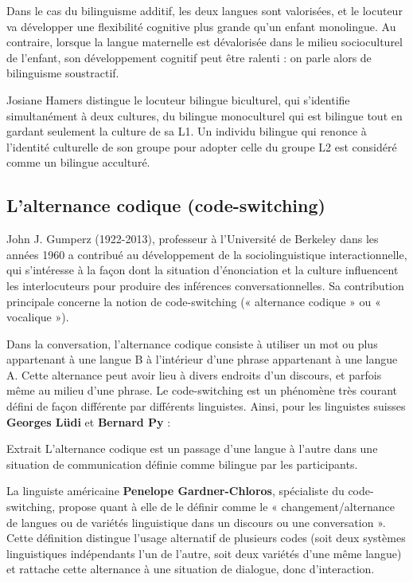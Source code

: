 Dans le cas du bilinguisme additif, les deux langues sont valorisées, et le locuteur va développer une flexibilité cognitive plus grande qu’un enfant monolingue. Au contraire, lorsque la langue maternelle est dévalorisée dans le milieu socioculturel de l’enfant, son développement cognitif peut être ralenti : on parle alors de bilinguisme soustractif.

Josiane Hamers distingue le locuteur bilingue biculturel, qui s’identifie simultanément à deux cultures, du bilingue monoculturel qui est bilingue tout en gardant seulement la culture de sa L1. Un individu bilingue qui renonce à l’identité culturelle de son groupe pour adopter celle du groupe L2 est considéré comme un bilingue acculturé.

\subsection{L’alternance codique (code-switching)}
John J. Gumperz (1922-2013), professeur à l’Université de Berkeley dans les années 1960 a contribué au développement de la sociolinguistique interactionnelle, qui s’intéresse à la façon dont
la situation d’énonciation et la culture influencent les interlocuteurs pour produire des inférences conversationnelles. Sa contribution principale concerne la notion de code-switching (« alternance codique » ou « vocalique »).

Dans la conversation, l’alternance codique consiste à utiliser un mot ou plus appartenant à une langue B à l’intérieur d’une phrase appartenant à une langue A. Cette alternance peut avoir lieu à divers endroits d’un discours, et parfois même au milieu d’une phrase. Le code-switching est un phénomène très courant défini de façon différente par différents linguistes. Ainsi, pour les linguistes suisses \textbf{Georges Lüdi} et \textbf{Bernard Py} :

\begin{lecture}{Extrait}
L’alternance codique est un passage d’une langue à l’autre dans une situation de communication définie comme bilingue par les participants.
\end{lecture}

La linguiste américaine \textbf{Penelope Gardner-Chloros}, spécialiste du code-switching, propose quant à elle de le définir comme le « changement/alternance de langues ou de variétés linguistique dans un discours ou une conversation ». Cette définition distingue l’usage alternatif de plusieurs codes (soit deux systèmes linguistiques indépendants l’un de l’autre, soit deux variétés d’une même langue) et rattache cette alternance à une situation de dialogue, donc d’interaction.

